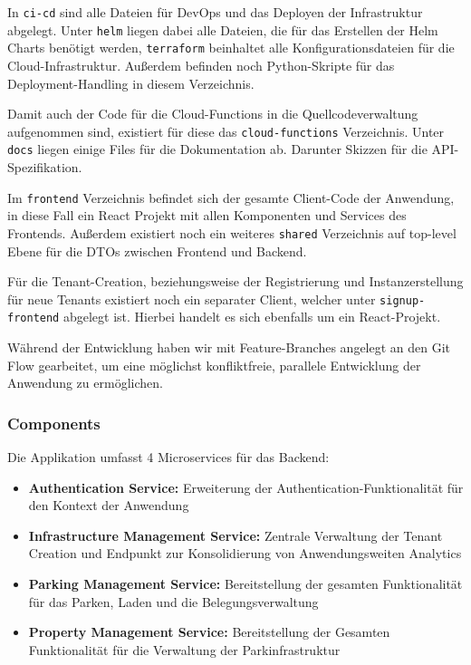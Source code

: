 In \verb|ci-cd| sind alle Dateien für DevOps und das Deployen der Infrastruktur abgelegt. Unter \verb|helm| liegen dabei alle Dateien, die für das Erstellen der Helm Charts benötigt werden, \verb|terraform| beinhaltet alle Konfigurationsdateien für die Cloud-Infrastruktur. Außerdem befinden noch Python-Skripte für das Deployment-Handling in diesem Verzeichnis.

Damit auch der Code für die Cloud-Functions in die Quellcodeverwaltung aufgenommen sind, existiert für diese das \verb|cloud-functions| Verzeichnis.
Unter \verb|docs| liegen einige Files für die Dokumentation ab. Darunter Skizzen für die API-Spezifikation.

Im \verb|frontend| Verzeichnis befindet sich der gesamte Client-Code der Anwendung, in diese Fall ein React Projekt mit allen Komponenten und Services des Frontends.
Außerdem existiert noch ein weiteres \verb|shared| Verzeichnis auf top-level Ebene für die DTOs zwischen Frontend und Backend.

Für die Tenant-Creation, beziehungsweise der Registrierung und Instanzerstellung für neue Tenants existiert noch ein separater Client, welcher unter \verb|signup-frontend| abgelegt ist. Hierbei handelt es sich ebenfalls um ein React-Projekt.

Während der Entwicklung haben wir mit Feature-Branches angelegt an den Git Flow gearbeitet, um eine möglichst konfliktfreie, parallele Entwicklung der Anwendung zu ermöglichen.

\subsubsection{Components}
Die Applikation umfasst 4 Microservices für das Backend:


\begin{itemize}
    \item \textbf{Authentication Service:} Erweiterung der Authentication-Funktionalität für den Kontext der Anwendung
    \item \textbf{Infrastructure Management Service:} Zentrale Verwaltung der Tenant Creation und Endpunkt zur Konsolidierung von Anwendungsweiten Analytics
    \item \textbf{Parking Management Service:} Bereitstellung der gesamten Funktionalität für das Parken, Laden und die Belegungsverwaltung
    \item \textbf{Property Management Service:} Bereitstellung der Gesamten Funktionalität für die Verwaltung der Parkinfrastruktur
\end{itemize}

